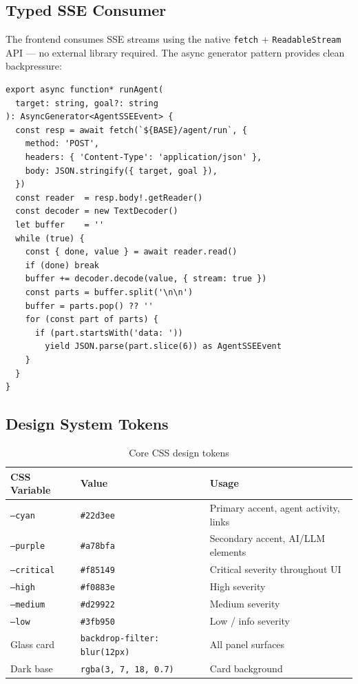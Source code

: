 \documentclass[12pt,a4paper]{article}
\begin{document}
\subsection{Typed SSE Consumer}

The frontend consumes SSE streams using the native \texttt{fetch} + \texttt{ReadableStream}
API --- no external library required. The async generator pattern provides clean backpressure:

\begin{lstlisting}[style=tsstyle, caption=Typed SSE consumer in api/agent.ts]
export async function* runAgent(
  target: string, goal?: string
): AsyncGenerator<AgentSSEEvent> {
  const resp = await fetch(`${BASE}/agent/run`, {
    method: 'POST',
    headers: { 'Content-Type': 'application/json' },
    body: JSON.stringify({ target, goal }),
  })
  const reader  = resp.body!.getReader()
  const decoder = new TextDecoder()
  let buffer    = ''
  while (true) {
    const { done, value } = await reader.read()
    if (done) break
    buffer += decoder.decode(value, { stream: true })
    const parts = buffer.split('\n\n')
    buffer = parts.pop() ?? ''
    for (const part of parts) {
      if (part.startsWith('data: '))
        yield JSON.parse(part.slice(6)) as AgentSSEEvent
    }
  }
}
\end{lstlisting}

\subsection{Design System Tokens}

\begin{table}[H]
\centering
\caption{Core CSS design tokens}
\begin{tabular}{lll}
\toprule
\textbf{CSS Variable} & \textbf{Value} & \textbf{Usage} \\
\midrule
\texttt{--cyan}   & \texttt{\#22d3ee} & Primary accent, agent activity, links \\
\texttt{--purple} & \texttt{\#a78bfa} & Secondary accent, AI/LLM elements \\
\texttt{--critical} & \texttt{\#f85149} & Critical severity throughout UI \\
\texttt{--high}   & \texttt{\#f0883e} & High severity \\
\texttt{--medium} & \texttt{\#d29922} & Medium severity \\
\texttt{--low}    & \texttt{\#3fb950} & Low / info severity \\
Glass card  & \texttt{backdrop-filter: blur(12px)} & All panel surfaces \\
Dark base   & \texttt{rgba(3, 7, 18, 0.7)} & Card background \\
\bottomrule
\end{tabular}
\end{table}
\end{document}
